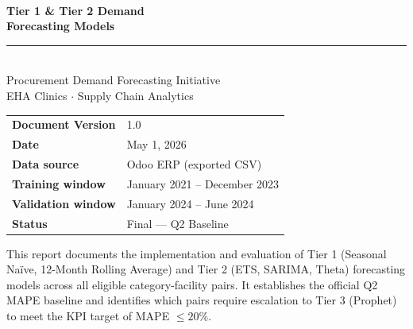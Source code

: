 \documentclass[12pt, a4paper]{article}
\begin{document}
\begin{titlepage}
  \pagecolor{ehaBlue}\color{white}
  \vspace*{1.8cm}

  {\fontsize{10}{12}\selectfont\MakeUppercase{}}\\[0.5em]
  {\fontsize{26}{32}\selectfont\bfseries Tier 1 \& Tier 2 Demand\\[0.3em]
   Forecasting Models}\\[1.2em]
  \textcolor{ehaAccent}{\rule{6cm}{2pt}}\\[1.2em]

  {\large Procurement Demand Forecasting Initiative}\\[0.4em]
  {\normalsize EHA Clinics $\cdot$ Supply Chain Analytics}\\[2.5cm]

  \begin{tabular}{@{}ll}
    \textbf{Document Version}  & 1.0 \\[0.4em]
    \textbf{Date}              & May 1, 2026 \\[0.4em]
    \textbf{Data source}       & Odoo ERP (exported CSV) \\[0.4em]
    \textbf{Training window}   & January 2021 -- December 2023 \\[0.4em]
    \textbf{Validation window} & January 2024 -- June 2024 \\[0.4em]
    \textbf{Status}            & Final --- Q2 Baseline \\
  \end{tabular}

  \vfill
  {\small\textcolor{white!70!ehaBlue}
    {This report documents the implementation and evaluation of Tier 1
     (Seasonal Na\"{i}ve, 12-Month Rolling Average) and Tier 2 (ETS,
     SARIMA, Theta) forecasting models across all eligible
     category-facility pairs. It establishes the official Q2 MAPE
     baseline and identifies which pairs require escalation to Tier 3
     (Prophet) to meet the KPI target of MAPE $\leq 20\%$.}}
\end{titlepage}
\pagecolor{white}\color{black}

\newpage
\end{document}
